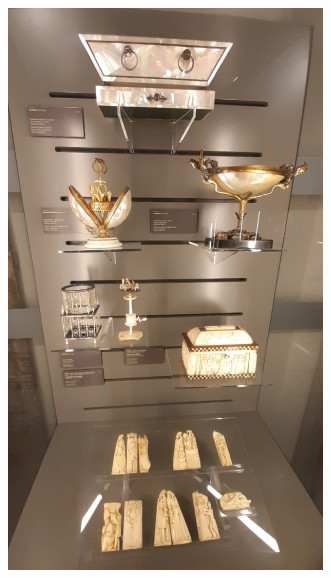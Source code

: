 \documentclass[12pt,a4paper]{article}
\begin{document}
\begin{enumerate}
\begin{minipage}{\linewidth}
\begin{minipage}{0.4\linewidth}
			\includegraphics[scale=1.25]{Avorio_madreperla.jpg}
		\end{minipage}
	\end{minipage}
	

\end{enumerate}
\end{document}
